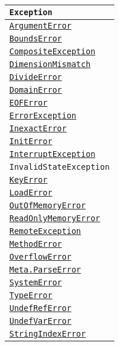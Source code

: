 \begin{table}[h]
\begin{tabulary}{\linewidth}{|L|}
\hline
\texttt{Exception} \\
\hline
\hyperlink{9721838137887538764}{\texttt{ArgumentError}} \\
\hline
\hyperlink{9731558909100893938}{\texttt{BoundsError}} \\
\hline
\hyperlink{15047752250898038281}{\texttt{CompositeException}} \\
\hline
\hyperlink{13752533629496758140}{\texttt{DimensionMismatch}} \\
\hline
\hyperlink{4168463413201806292}{\texttt{DivideError}} \\
\hline
\hyperlink{14085880504701688639}{\texttt{DomainError}} \\
\hline
\hyperlink{2683611566077490148}{\texttt{EOFError}} \\
\hline
\hyperlink{12102596058483452470}{\texttt{ErrorException}} \\
\hline
\hyperlink{5399118524830636312}{\texttt{InexactError}} \\
\hline
\hyperlink{15248096136337910028}{\texttt{InitError}} \\
\hline
\hyperlink{11255134339055983338}{\texttt{InterruptException}} \\
\hline
\texttt{InvalidStateException} \\
\hline
\hyperlink{12862287453053981792}{\texttt{KeyError}} \\
\hline
\hyperlink{15548397364092946520}{\texttt{LoadError}} \\
\hline
\hyperlink{9656432107553099418}{\texttt{OutOfMemoryError}} \\
\hline
\hyperlink{5617183776424836760}{\texttt{ReadOnlyMemoryError}} \\
\hline
\hyperlink{10250718604436154991}{\texttt{RemoteException}} \\
\hline
\hyperlink{68769522931907606}{\texttt{MethodError}} \\
\hline
\hyperlink{10461069697702909970}{\texttt{OverflowError}} \\
\hline
\hyperlink{6896679243086513948}{\texttt{Meta.ParseError}} \\
\hline
\hyperlink{16303515589950241655}{\texttt{SystemError}} \\
\hline
\hyperlink{2622693721821893139}{\texttt{TypeError}} \\
\hline
\hyperlink{7764749529861419421}{\texttt{UndefRefError}} \\
\hline
\hyperlink{4452889246677411554}{\texttt{UndefVarError}} \\
\hline
\hyperlink{414193743931514144}{\texttt{StringIndexError}} \\
\hline
\end{tabulary}

\end{table}



